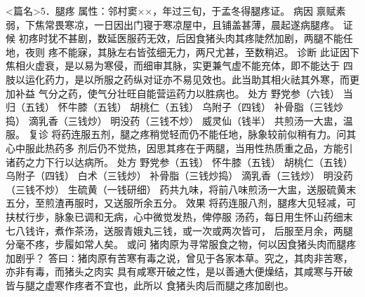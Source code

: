 \documentclass[a4paper,12pt,UTF8,twoside]{ctexbook}
\begin{document}
<篇名>5．腿疼
属性：邻村窦××，年过三旬，于孟冬得腿疼证。 
病因 禀赋素弱，下焦常畏寒凉，一日因出门寝于寒凉屋中，且铺盖甚薄，晨起遂病腿疼。 
证候 初疼时犹不甚剧，数延医服药无效，后因食猪头肉其疼陡然加剧，两腿不能任地，夜则 
疼不能寐，其脉左右皆弦细无力，两尺尤甚，至数稍迟。 
诊断 此证因下焦相火虚衰，是以易为寒侵，而细审其脉，实更兼气虚不能充体，即不能达于 
四肢以运化药力，是以所服之药纵对证亦不易见效也。此当助其相火祛其外寒，而更加补益 
气分之药，使气分壮旺自能营运药力以胜病也。 
处方 野党参（六钱） 当归（五钱） 怀牛膝（五钱） 胡桃仁（五钱） 
乌附子（四钱） 补骨脂（三钱炒捣） 滴乳香（三钱炒） 明没药（三钱不炒） 威灵仙（钱半） 
共煎汤一大盅，温服。 
复诊 将药连服五剂，腿之疼稍觉轻而仍不能任地，脉象较前似稍有力。问其心中服此热药多 
剂后仍不觉热，因思其疼在于两腿，当用性热质重之品，方能引诸药之力下行以达病所。 
处方 野党参（五钱） 怀牛膝（五钱） 胡桃仁（五钱） 乌附子（四钱） 
白术（三钱炒） 补骨脂（三钱炒捣） 滴乳香（三钱炒） 明没药（三钱不炒） 生硫黄（一钱研细） 
药共九味，将前八味煎汤一大盅，送服硫黄末五分，至煎渣再服时，又送服所余五分。 
效果 将药连服八剂，腿疼大见轻减，可扶杖行步，脉象已调和无病，心中微觉发热，俾停服 
汤药，每日用生怀山药细末七八钱许，煮作茶汤，送服青娥丸三钱，或一次或两次皆可， 
后服至月余，两腿分毫不疼，步履如常人矣。 
或问 猪肉原为寻常服食之物，何以因食猪头肉而腿疼加剧乎？ 
答曰∶猪肉原有苦寒有毒之说，曾见于各家本草。究之，其肉非苦寒，亦非有毒，而猪头之肉实 
具有咸寒开破之性，是以善通大便燥结，其咸寒与开破皆与腿之虚寒作疼者不宜也，此所以 
食猪头肉后而腿之疼加剧也。 
\end{document}
